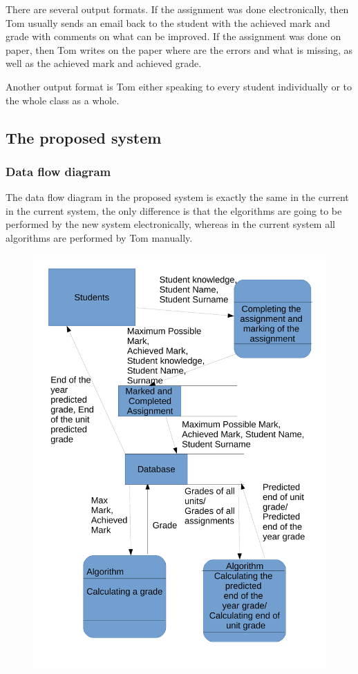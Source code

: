 There are several output formats. If the assignment was done electronically, then Tom usually sends an email back to the student with the achieved mark and grade with comments on what can be improved. If the assignment was done on paper, then Tom writes on the paper where are the errors and what is missing, as well as the achieved mark and achieved grade.

Another output format is Tom either speaking to every student individually or to the whole class as a whole.

\subsection{The proposed system}
\subsubsection{Data flow diagram}

The data flow diagram in the proposed system is exactly the same in the current in the current system, the only difference is that the elgorithms are going to be performed by the new system electronically, whereas in the current system all algorithms are performed by Tom manually.

\begin{figure}[H]
    \includegraphics[width=\textwidth]{./Analysis/images/222DataFlowDiagram.pdf}
\end{figure}

